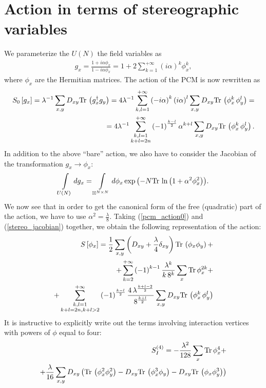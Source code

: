 \documentclass[12pt]{article}
\newcommand{\lr}[1]{ \left( #1 \right) }
\newcommand{\lrs}[1]{ \left[ #1 \right] }
\newcommand{\tr}{ {\rm Tr} \, }
\newcommand{\expa}[1]{ \exp{\left( #1 \right)} }
\begin{document}
\section{Action in terms of stereographic variables}
\label{sec:action_stereo}

 We parameterize the $U\lr{N}$ the field variables as
\begin{eqnarray}
\label{stereographic_projection}
 g_x
 =
 \frac{1 + i \alpha \phi_x}{1 - i \alpha \phi_x}
 =
 1 + 2 \sum\limits_{k=1}^{+\infty} \lr{i \alpha}^k \phi_x^k
,
\end{eqnarray}
where $\phi_x$ are the Hermitian matrices. The action of the PCM is now rewritten as
\begin{eqnarray}
\label{pcm_action0}
 S_0\lrs{g_x} = \lambda^{-1} \sum\limits_{x,y} D_{x y} \tr\lr{g^{\dag}_x g_y}
 =  4 \lambda^{-1} \sum\limits_{k,l=1}^{+\infty} \lr{-i \alpha}^k \lr{i \alpha}^l
      \sum\limits_{x,y} D_{xy} \tr\lr{\phi_x^k \, \phi_y^l}
 = \nonumber\\ =
 4 \lambda^{-1} \sum\limits_{\substack{k,l=1\\k+l=2 n}}^{+\infty}
  \lr{-1}^{\frac{k-l}{2}} \alpha^{k+l}
       \sum\limits_{x,y} D_{xy} \tr\lr{\phi_x^k \, \phi_y^l} .
\end{eqnarray}
In addition to the above ``bare'' action, we also have to consider the Jacobian of the transformation $g_x \rightarrow \phi_x$:
\begin{eqnarray}
\label{stereo_jacobian}
 \int\limits_{U\lr{N}} dg_x = \int\limits_{\mathbb{H}^{N\times N}} d\phi_x \expa{-N \tr\ln\lr{1 + \alpha^2 \phi_x^2}} .
\end{eqnarray}
We now see that in order to get the canonical form of the free (quadratic) part of the action, we have to use $\alpha^2 = \frac{\lambda}{8}$. Taking (\ref{pcm_action0}) and (\ref{stereo_jacobian}) together, we obtain the following representation of the action:
\begin{eqnarray}
\label{pcm_action}
 S\lrs{\phi_x} =
 \frac{1}{2} \sum\limits_{x,y} \lr{D_{xy} + \frac{\lambda}{4} \delta_{x y}} \tr\lr{\phi_x \phi_y}
 + \nonumber \\ +
 \sum\limits_{k=2}^{+\infty} \lr{-1}^{k-1} \frac{\lambda^{k}}{k \, 8^k} \sum\limits_x \tr \phi_x^{2 k}
 + \nonumber \\ +
 \sum\limits_{\substack{k,l=1\\k+l=2 n,k+l>2}}^{+\infty}
  \lr{-1}^{\frac{k-l}{2}} \frac{4 \, \lambda^{\frac{k+l-2}{2}}}{8^{\frac{k+l}{2}}}
       \sum\limits_{x,y} D_{xy} \tr\lr{\phi_x^k \, \phi_y^l}
\end{eqnarray}
It is instructive to explicitly write out the terms involving interaction vertices with powers of $\phi$ equal to four:
\begin{eqnarray}
\label{interaction_action_phi4}
 S_I^{\lr{4}} = - \frac{\lambda^2}{128} \sum\limits_x \tr \phi_x^4
 + \nonumber \\ +
 \frac{\lambda}{16} \sum\limits_{x, y} D_{x y} \lr{\tr\lr{\phi_x^2 \phi_y^2} - D_{x y} \tr\lr{\phi_x^3 \phi_y} - D_{x y} \tr\lr{\phi_x \phi_y^3} }
\end{eqnarray}
\end{document}
